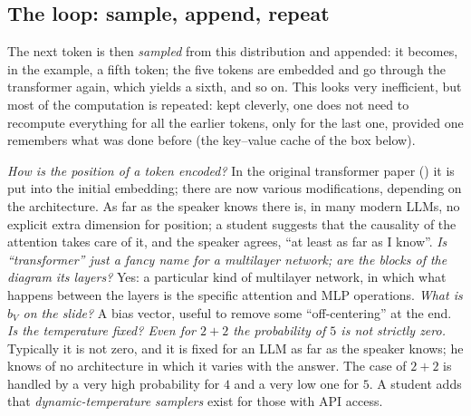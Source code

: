 \subsection{The loop: sample, append, repeat}\label{sec:L6-loop}
The next token is then \emph{sampled} from this distribution and appended: it becomes, in the example, a fifth token; the five tokens are embedded and go through the transformer again, which yields a sixth, and so on. This looks very inefficient, but most of the computation is repeated: kept cleverly, one does not need to recompute everything for all the earlier tokens, only for the last one, provided one remembers what was done before (the key--value cache of the box below).

\begin{discussion}
\emph{How is the position of a token encoded?} In the original transformer paper () it is put into the initial embedding; there are now various modifications, depending on the architecture. As far as the speaker knows there is, in many modern LLMs, no explicit extra dimension for position; a student suggests that the causality of the attention takes care of it, and the speaker agrees, ``at least as far as I know''\flag.
\emph{Is ``transformer'' just a fancy name for a multilayer network; are the blocks of the diagram its layers?} Yes: a particular kind of multilayer network, in which what happens between the layers is the specific attention and MLP operations. \emph{What is $b_V$ on the slide?} A bias vector, useful to remove some ``off-centering'' at the end.
\emph{Is the temperature fixed? Even for $2+2$ the probability of $5$ is not strictly zero.} Typically it is not zero, and it is fixed for an LLM as far as the speaker knows; he knows of no architecture in which it varies with the answer. The case of $2+2$ is handled by a very high probability for $4$ and a very low one for $5$. A student adds that \emph{dynamic-temperature samplers} exist for those with API access.
\end{discussion}

